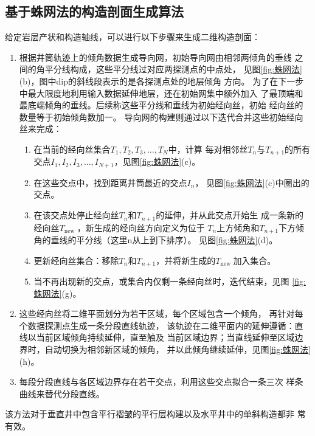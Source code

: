 \documentclass[a4paper,twoside]{ctexart}
\begin{document}
\subsection{基于蛛网法的构造剖面生成算法}
\label{sec:蛛网法}
给定岩层产状和构造轴线，可以进行以下步骤来生成二维构造剖面：
\begin{enumerate}
\item 根据井筒轨迹上的倾角数据生成导向网，初始导向网由相邻两倾角的垂线
  之间的角平分线构成，这些平分线过对应两探测点的中点处，
  见图\ref{fig:蛛网法}(b)，图中dip的斜线段表示的是各探测点处的地层倾角
  方向。
  为了在下一步中最大限度地利用输入数据延伸地层，还在初始网集中额外加入
  了最顶端和最底端倾角的垂线。后续称这些平分线和垂线为初始经向丝，初始
  经向丝的数量等于初始倾角数加一。
  导向网的构建则通过以下迭代合并这些初始经向丝来完成：
  \begin{enumerate}[步骤1:]
  \item 在当前的经向丝集合$T_{1}, T_{2}, T_{3}, \ldots, T_{N}$中，计算
    每对相邻丝$T_{n}$与$T_{n+1}$的所有交点$I_{1}, I_{2}, I_{3},
    \ldots, I_{N+1} $，见图\ref{fig:蛛网法}(c)。 
  \item 在这些交点中，找到距离井筒最近的交点$I_{n}$，
    见图\ref{fig:蛛网法}(c)中圈出的交点。
  \item 在该交点处停止经向丝$T_{n}$和$T_{n+1}$的延伸，并从此交点开始生
    成一条新的经向丝$T_{\text {new }}$，新生成的经向丝方向定义为位于
    $T_n$上方倾角和$T_{n+1}$下方倾角的垂线的平分线（这里n从上到下排序）。
    见图\ref{fig:蛛网法}(d)。 
  \item 更新经向丝集合：移除$T_{n}$和$T_{n+1}$，并将新生成的$T_{\text
      {new }}$加入集合。 
  \item 当不再出现新的交点，或集合内仅剩一条经向丝时，迭代结束，见图
    \ref{fig:蛛网法}(g)。
  \end{enumerate}
  \item  
    这些经向丝将二维平面划分为若干区域，每个区域包含一个倾角，
    再针对每个数据探测点生成一条分段直线轨迹，
    该轨迹在二维平面内的延伸遵循：直线以当前区域倾角持续延伸，直至触及
    当前区域边界；当直线延伸至区域边界时，自动切换为相邻新区域的倾角，
    并以此倾角继续延伸，见图\ref{fig:蛛网法}(h)。
  \item 每段分段直线与各区域边界存在若干交点，利用这些交点拟合一条三次
    样条曲线来替代分段直线。
  \end{enumerate}
  该方法对于垂直井中包含平行褶皱的平行层构建以及水平井中的单斜构造都非
  常有效。
\end{document}
